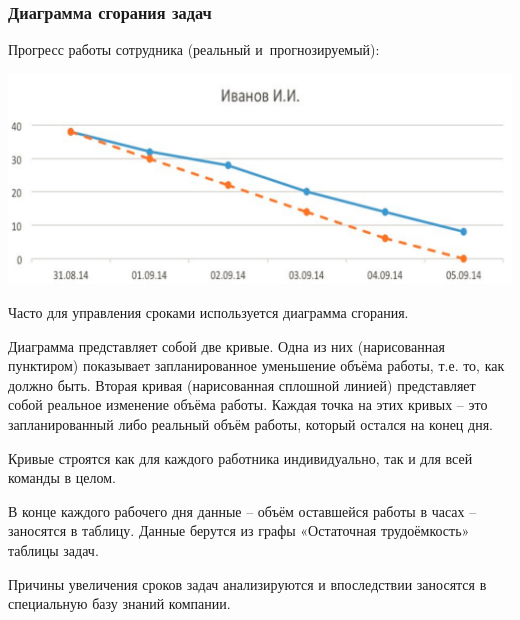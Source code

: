 \documentclass{../industrial-development}
\begin{document}
\begin{frame} \frametitle{Диаграмма сгорания задач}
	Прогресс работы сотрудника (реальный и~прогнозируемый):
	\centerline{\includegraphics[width=1\textwidth]{ivanov.pdf}}
\end{frame}
\lecturenotes
Часто для управления сроками используется диаграмма сгорания. 

Диаграмма представляет собой две кривые. Одна из них (нарисованная пунктиром) показывает запланированное уменьшение объёма работы, т.е. то, как должно быть. Вторая кривая (нарисованная сплошной линией) представляет собой реальное изменение объёма работы. Каждая точка на этих кривых – это запланированный либо реальный объём работы, который остался на конец дня.

Кривые строятся как для каждого работника индивидуально, так и для всей команды в целом.

В конце каждого рабочего дня данные – объём оставшейся работы в часах – заносятся в таблицу. Данные берутся из графы «Остаточная трудоёмкость» таблицы задач.

Причины увеличения сроков задач анализируются и впоследствии заносятся в специальную базу знаний компании.
\end{document}

